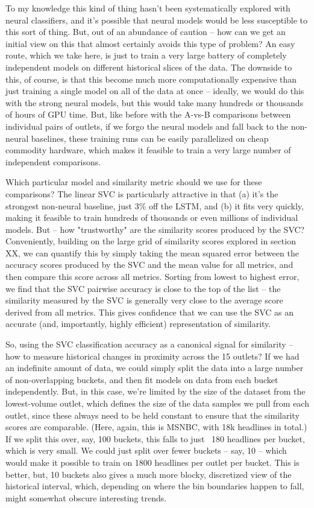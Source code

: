 \documentclass{scrartcl}
\begin{document}
To my knowledge this kind of thing hasn't been systematically explored with neural classifiers, and it's possible that neural models would be less susceptible to this sort of thing. But, out of an abundance of caution -- how can we get an initial view on this that almost certainly avoids this type of problem? An easy route, which we take here, is just to train a very large battery of completely independent models on different historical slices of the data. The downside to this, of course, is that this become much more computationally expensive than just training a single model on all of the data at once -- ideally, we would do this with the strong neural models, but this would take many hundreds or thousands of hours of GPU time. But, like before with the A-vs-B comparisons between individual pairs of outlets, if we forgo the neural models and fall back to the non-neural baselines, these training runs can be easily parallelized on cheap commodity hardware, which makes it feasible to train a very large number of independent comparisons.

Which particular model and similarity metric should we use for these comparisons? The linear SVC is particularly attractive in that (a) it's the strongest non-neural baseline, just 3\% off the LSTM, and (b) it fits very quickly, making it feasible to train hundreds of thousands or even millions of individual models. But -- how "trustworthy" are the similarity scores produced by the SVC? Conveniently, building on the large grid of similarity scores explored in section XX, we can quantify this by simply taking the mean squared error between the accuracy scores produced by the SVC and the mean value for all metrics, and then compare this score across all metrics. Sorting from lowest to highest error, we find that the SVC pairwise accuracy is close to the top of the list -- the similarity measured by the SVC is generally very close to the average score derived from all metrics. This gives confidence that we can use the SVC as an accurate (and, importantly, highly efficient) representation of similarity.

So, using the SVC classification accuracy as a canonical signal for similarity -- how to measure historical changes in proximity across the 15 outlets? If we had an indefinite amount of data, we could simply split the data into a large number of non-overlapping buckets, and then fit models on data from each bucket independently. But, in this case, we're limited by the size of the dataset from the lowest-volume outlet, which defines the size of the data samples we pull from each outlet, since these always need to be held constant to ensure that the similarity scores are comparable. (Here, again, this is MSNBC, with 18k headlines in total.) If we split this over, say, 100 buckets, this falls to just ~180 headlines per bucket, which is very small. We could just split over fewer buckets -- say, 10 -- which would make it possible to train on 1800 headlines per outlet per bucket. This is better, but, 10 buckets also gives a much more blocky, discretized view of the historical interval, which, depending on where the bin boundaries happen to fall, might somewhat obscure interesting trends.
\end{document}
